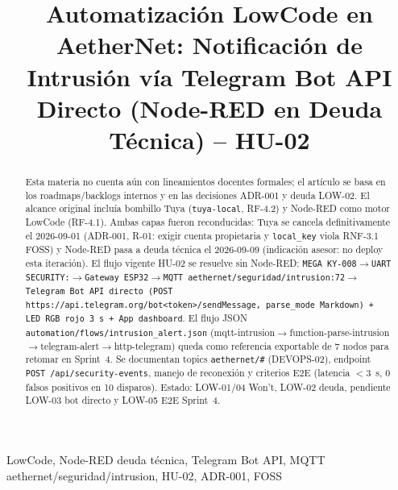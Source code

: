 \documentclass[conference]{IEEEtran}
\begin{document}
\title{Automatización LowCode en AetherNet: Notificación de Intrusión vía Telegram Bot API Directo (Node-RED en Deuda Técnica) -- HU-02}
\author{
\and
{}
}
\maketitle

\begin{abstract}
Esta materia no cuenta aún con lineamientos docentes formales; el artículo se basa en los roadmaps/backlogs internos y en las decisiones ADR-001 y deuda LOW-02. El alcance original incluía bombillo Tuya (\texttt{tuya-local}, RF-4.2) y Node-RED como motor LowCode (RF-4.1). Ambas capas fueron reconducidas: Tuya se cancela definitivamente el 2026-09-01 (ADR-001, R-01: exigir cuenta propietaria y \texttt{local\_key} viola RNF-3.1 FOSS) y Node-RED pasa a deuda técnica el 2026-09-09 (indicación asesor: no deploy esta iteración). El flujo vigente HU-02 se resuelve sin Node-RED: \texttt{MEGA KY-008$\rightarrow$UART SECURITY:$\rightarrow$Gateway ESP32$\rightarrow$MQTT aethernet/seguridad/intrusion:72$\rightarrow$Telegram Bot API directo (POST https://api.telegram.org/bot<token>/sendMessage, parse\_mode Markdown) + LED RGB rojo 3~s + App dashboard}. El flujo JSON \texttt{automation/flows/intrusion\_alert.json} (mqtt-intrusion$\rightarrow$function-parse-intrusion$\rightarrow$telegram-alert$\rightarrow$http-telegram) queda como referencia exportable de 7 nodos para retomar en Sprint~4. Se documentan topics \texttt{aethernet/\#} (DEVOPS-02), endpoint \texttt{POST /api/security-events}, manejo de reconexión y criterios E2E (latencia $<$3~s, 0 falsos positivos en 10 disparos). Estado: LOW-01/04 Won't, LOW-02 deuda, pendiente LOW-03 bot directo y LOW-05 E2E Sprint~4.
\end{abstract}
\begin{IEEEkeywords}
LowCode, Node-RED deuda técnica, Telegram Bot API, MQTT aethernet/seguridad/intrusion, HU-02, ADR-001, FOSS
\end{IEEEkeywords}
\end{document}
